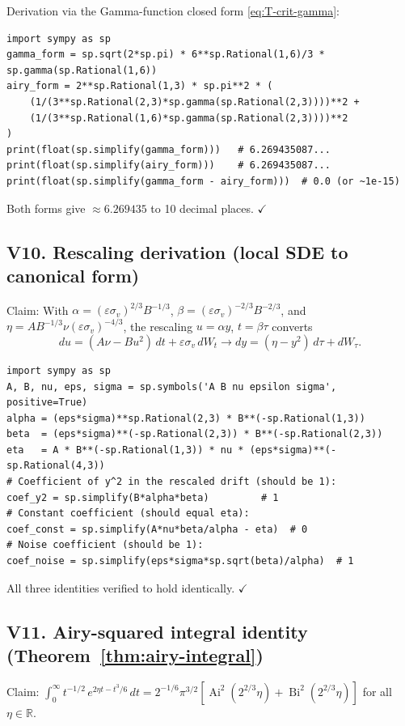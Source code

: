\documentclass[11pt,a4paper]{article}
\theoremstyle{plain}
\theoremstyle{definition}
\newcommand{\R}{\mathbb{R}}
\newcommand{\eps}{\varepsilon}
\newcommand{\Ai}{\operatorname{Ai}}
\newcommand{\Bi}{\operatorname{Bi}}
\begin{document}
Derivation via the Gamma-function closed form \eqref{eq:T-crit-gamma}:
\begin{verbatim}
import sympy as sp
gamma_form = sp.sqrt(2*sp.pi) * 6**sp.Rational(1,6)/3 * sp.gamma(sp.Rational(1,6))
airy_form = 2**sp.Rational(1,3) * sp.pi**2 * (
    (1/(3**sp.Rational(2,3)*sp.gamma(sp.Rational(2,3))))**2 +
    (1/(3**sp.Rational(1,6)*sp.gamma(sp.Rational(2,3))))**2
)
print(float(sp.simplify(gamma_form)))   # 6.269435087...
print(float(sp.simplify(airy_form)))    # 6.269435087...
print(float(sp.simplify(gamma_form - airy_form)))  # 0.0 (or ~1e-15)
\end{verbatim}
Both forms give $\approx 6.269435$ to 10 decimal places. $\checkmark$

\subsection*{V10. Rescaling derivation (local SDE to canonical form)}

Claim: With $\alpha = (\eps\sigma_v)^{2/3}B^{-1/3}$, $\beta = (\eps\sigma_v)^{-2/3}B^{-2/3}$, and $\eta = AB^{-1/3}\nu(\eps\sigma_v)^{-4/3}$, the rescaling $u = \alpha y$, $t = \beta\tau$ converts
$$du = (A\nu - Bu^2)\,dt + \eps\sigma_v\,dW_t \longrightarrow dy = (\eta - y^2)\,d\tau + dW_\tau.$$

\begin{verbatim}
import sympy as sp
A, B, nu, eps, sigma = sp.symbols('A B nu epsilon sigma', positive=True)
alpha = (eps*sigma)**sp.Rational(2,3) * B**(-sp.Rational(1,3))
beta  = (eps*sigma)**(-sp.Rational(2,3)) * B**(-sp.Rational(2,3))
eta   = A * B**(-sp.Rational(1,3)) * nu * (eps*sigma)**(-sp.Rational(4,3))
# Coefficient of y^2 in the rescaled drift (should be 1):
coef_y2 = sp.simplify(B*alpha*beta)         # 1
# Constant coefficient (should equal eta):
coef_const = sp.simplify(A*nu*beta/alpha - eta)  # 0
# Noise coefficient (should be 1):
coef_noise = sp.simplify(eps*sigma*sp.sqrt(beta)/alpha)  # 1
\end{verbatim}
All three identities verified to hold identically. $\checkmark$

\subsection*{V11. Airy-squared integral identity (Theorem~\ref{thm:airy-integral})}

Claim: $\int_0^\infty t^{-1/2}\,e^{2\eta t - t^3/6}\,dt = 2^{-1/6}\pi^{3/2}[\Ai^2(2^{2/3}\eta) + \Bi^2(2^{2/3}\eta)]$ for all $\eta\in\R$.
\end{document}
